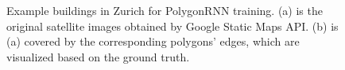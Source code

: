 \begin{figure}[!h]
{	}
    \caption[Example buildings in Zurich for PolygonRNN training]{Example buildings in Zurich for PolygonRNN training. (a) is the original satellite images obtained by Google Static Maps API. (b) is (a) covered by the corresponding polygons' edges, which are visualized based on the ground truth.}
	\label{fig:egbui}
\end{figure}